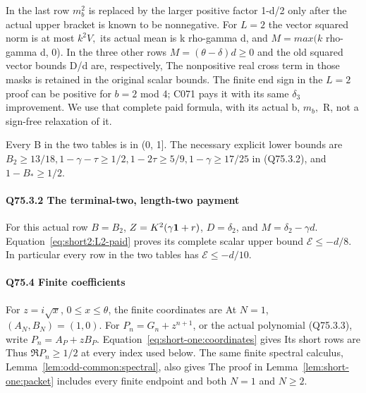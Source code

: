 In the last row \(m_b^2\) is replaced by the larger positive factor 1-d/2
only after the actual upper bracket is known to be nonnegative.
For \(L=2\) the vector squared norm is at most \(k^2V,\allowbreak \) its actual mean is
k rho-gamma d, and \(M=max(k\) rho-gamma d, 0). In the three other
rows \(M=(\theta-\delta)d\ge 0\) and the old squared vector bounds D/d are,
respectively,
The nonpositive real cross term in those masks is retained in the
original scalar bounds. The finite end sign in the \(L=2\) proof can be
positive for \(b=2\) mod 4; C071 pays it with its same \(\delta_3\) improvement.
We use that complete paid formula, with its actual b, \(m_b,\allowbreak \) R, not a
sign-free relaxation of it.

Every B in the two tables is in (0, 1]. The necessary explicit lower
bounds are \(B_2\ge 13/18,\allowbreak  1-\gamma-\tau\ge 1/2,\allowbreak  1-2\tau\ge 5/9,\allowbreak  1-\gamma\ge 17/25\) in (Q75.3.2), and \(1-B_*\ge 1/2.\)

\paragraph{Q75.3.2 The terminal-two, length-two payment}\label{part:Q75.3.2}
For this actual row \(B=B_2\), \(Z=K^2(\gamma\mathbf1+r)\),
\(D=\delta_2\), and \(M=\delta_2-\gamma d\).
Equation~\eqref{eq:short2:L2-paid} proves its complete scalar
upper bound \(\mathcal E\le-d/8\).
In particular every row in the two tables has \(\mathcal E\le-d/10\).

\paragraph{Q75.4 Finite coefficients}\label{part:Q75.4}
For \(z=i\sqrt x\), \(0\le x\le\theta\), the finite coordinates are
At \(N=1\), \((A_N,B_N)=(1,0)\).
For \(P_n=G_n+z^{n+1}\), or the actual polynomial (Q75.3.3), write
\(P_n=A_P+zB_P\). Equation~\eqref{eq:short-one:coordinates} gives
Its short rows are
Thus \(\Re P_n\ge1/2\) at every index used below.
The same finite spectral calculus, Lemma~\ref{lem:odd-common:spectral},
also gives
The proof in Lemma~\ref{lem:short-one:packet} includes every finite
endpoint and both \(N=1\) and \(N\ge2\).

